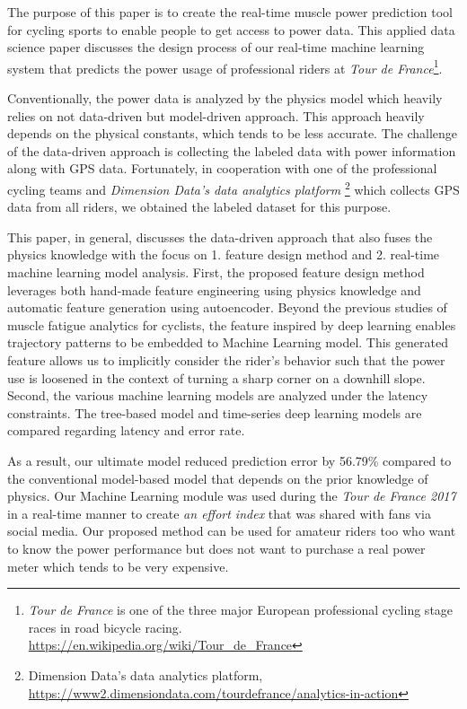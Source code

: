 \documentclass[runningheads]{llncs}
\begin{document}
The purpose of this paper is to create the real-time muscle power prediction tool for cycling sports to enable people to get access to power data. This applied data science paper discusses the design process of our real-time machine learning system that predicts the power usage of professional riders at {\it{Tour de France}}\footnote{{\it{Tour de France}} is one of the
three major European professional cycling stage races in road bicycle
racing.  \url{https://en.wikipedia.org/wiki/Tour_de_France} }.

Conventionally, the power data is analyzed by the physics model which heavily relies on not data-driven but model-driven approach. This approach heavily depends on the physical constants, which tends to be less accurate. The challenge of the data-driven approach is collecting the labeled data with power information along with GPS data. Fortunately, in cooperation with one of the professional cycling teams and {\it{Dimension Data's data analytics platform}} \footnote{Dimension Data's data analytics platform,
\url{https://www2.dimensiondata.com/tourdefrance/analytics-in-action}} which collects GPS data from all riders, we obtained the labeled dataset for this purpose.

This paper, in general, discusses the data-driven approach that also fuses the physics knowledge with the focus on 1. feature design method and 2. real-time machine learning model analysis. First, the proposed feature design method leverages both hand-made feature engineering using physics knowledge and automatic feature generation using autoencoder. Beyond the previous studies of muscle fatigue analytics for cyclists, the feature inspired by deep learning enables trajectory patterns to be embedded to Machine Learning model. This generated feature allows us to implicitly consider the rider's behavior such that the power use is loosened in the context of turning a sharp corner on a downhill slope. Second, the various machine learning models are analyzed under the latency constraints. The tree-based model and time-series deep learning models are compared regarding latency and error rate.

As a result, our ultimate model reduced prediction error by 56.79\% compared to the conventional model-based model that depends on the prior knowledge of physics. Our Machine Learning module was used during the {\it{Tour de France 2017}} in a real-time manner to create {\it{an effort index}} that was shared with fans via social media. Our proposed method can be used for amateur riders too who want to know the power performance but does not want to purchase a real power meter which tends to be very expensive.
\end{document}
